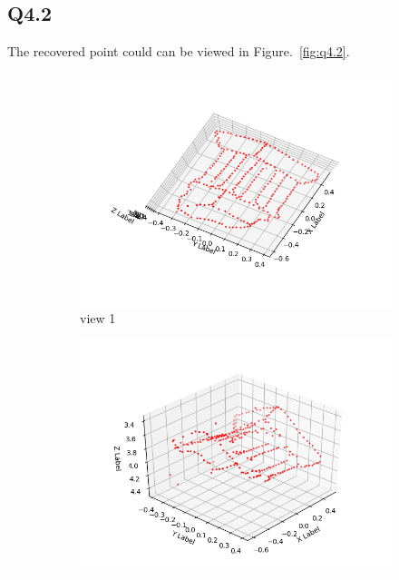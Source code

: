 \documentclass[11pt]{article}
\begin{document}
\newpage

\subsection*{Q4.2}

The recovered point could can be viewed in Figure.~\ref{fig:q4.2}.

\begin{figure}[h!]
    \begin{subfigure}{.49\textwidth}
      \centering
      \includegraphics[width=.95\linewidth]{../results/q4_2_1.png}
      \caption{view 1}
    \end{subfigure}
    \begin{subfigure}{.49\textwidth}
      \centering
      \includegraphics[width=.95\linewidth]{../results/q4_2_2.png}

\end{subfigure}
\end{figure}
\end{document}
